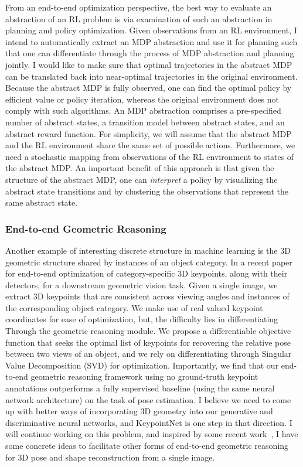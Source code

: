 \documentclass[a4paper, 10pt]{article}
\begin{document}
From an end-to-end optimization perspective, the best way to evaluate
an abstraction of an RL problem is via examination of such an
abstraction in planning and policy optimization. Given observations
from an RL environment, I intend to automatically extract an MDP
abstraction and use it for planning such that one can differentiate
through the process of MDP abstraction and planning jointly. I would
like to make sure that optimal trajectories in the abstract MDP can be
translated back into near-optimal trajectories in the original
environment. Because the abstract MDP is fully observed, one can find
the optimal policy by efficient value or policy iteration, whereas the
original environment does not comply with such algorithms. An MDP
abstraction comprises a pre-specified number of abstract states, a
transition model between abstract states, and an abstract reward
function. For simplicity, we will assume that the abstract MDP and the
RL environment share the same set of possible actions. Furthermore, we
need a stochastic mapping from observations of the RL environment to
states of the abstract MDP. An important benefit of this approach is
that given the structure of the abstract MDP, one can {\em interpret} a
policy by visualizing the abstract state transitions and by clustering
the observations that represent the same abstract state.

\vspace*{-.2cm}
\subsubsection*{End-to-end Geometric Reasoning}
\vspace*{-.1cm}

\hspace{\parindent} Another example of interesting discrete structure
in machine learning is the 3D geometric structure shared by instances
of an object category. In a recent paper~\cite{keypointnet} for
end-to-end optimization of category-specific 3D keypoints, along with
their detectors, for a downstream geometric vision task. Given a
single image, we extract 3D keypoints that are consistent across
viewing angles and instances of the corresponding object category. We
make use of real valued keypoint coordinates for ease of optimization,
but, the difficulty lies in differentiating Through the geometric
reasoning module. We propose a differentiable objective function that
seeks the optimal list of keypoints for recovering the relative pose
between two views of an object, and we rely on differentiating through
Singular Value Decomposition (SVD) for optimization.  Importantly, we
find that our end-to-end geometric reasoning framework using no
ground-truth keypoint annotations outperforms a fully supervised
baseline (using the same neural network architecture) on the task of
pose estimation. I believe we need to come up with better ways of
incorporating 3D geometry into our generative and discriminative
neural networks, and KeypointNet is one step in that direction. I will
continue working on this problem, and inspired by some recent
work~\cite{kanazawa}, I have some concrete ideas to facilitate other
forms of end-to-end geometric reasoning for 3D pose and shape
reconstruction from a single image.
\end{document}
